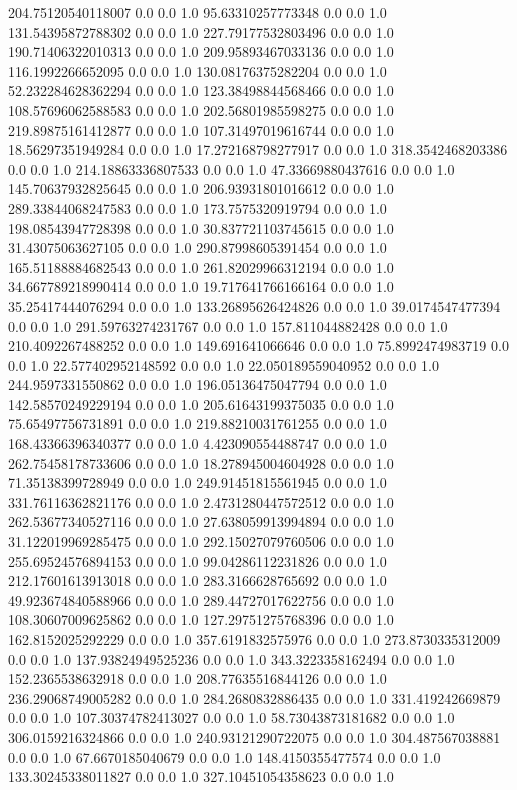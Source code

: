 204.75120540118007	0.0	0.0	1.0
95.63310257773348	0.0	0.0	1.0
131.54395872788302	0.0	0.0	1.0
227.79177532803496	0.0	0.0	1.0
190.71406322010313	0.0	0.0	1.0
209.95893467033136	0.0	0.0	1.0
116.1992266652095	0.0	0.0	1.0
130.08176375282204	0.0	0.0	1.0
52.232284628362294	0.0	0.0	1.0
123.38498844568466	0.0	0.0	1.0
108.57696062588583	0.0	0.0	1.0
202.56801985598275	0.0	0.0	1.0
219.89875161412877	0.0	0.0	1.0
107.31497019616744	0.0	0.0	1.0
18.56297351949284	0.0	0.0	1.0
17.272168798277917	0.0	0.0	1.0
318.3542468203386	0.0	0.0	1.0
214.18863336807533	0.0	0.0	1.0
47.33669880437616	0.0	0.0	1.0
145.70637932825645	0.0	0.0	1.0
206.93931801016612	0.0	0.0	1.0
289.33844068247583	0.0	0.0	1.0
173.7575320919794	0.0	0.0	1.0
198.08543947728398	0.0	0.0	1.0
30.837721103745615	0.0	0.0	1.0
31.43075063627105	0.0	0.0	1.0
290.87998605391454	0.0	0.0	1.0
165.51188884682543	0.0	0.0	1.0
261.82029966312194	0.0	0.0	1.0
34.667789218990414	0.0	0.0	1.0
19.717641766166164	0.0	0.0	1.0
35.25417444076294	0.0	0.0	1.0
133.26895626424826	0.0	0.0	1.0
39.0174547477394	0.0	0.0	1.0
291.59763274231767	0.0	0.0	1.0
157.811044882428	0.0	0.0	1.0
210.4092267488252	0.0	0.0	1.0
149.691641066646	0.0	0.0	1.0
75.8992474983719	0.0	0.0	1.0
22.577402952148592	0.0	0.0	1.0
22.050189559040952	0.0	0.0	1.0
244.9597331550862	0.0	0.0	1.0
196.05136475047794	0.0	0.0	1.0
142.58570249229194	0.0	0.0	1.0
205.61643199375035	0.0	0.0	1.0
75.65497756731891	0.0	0.0	1.0
219.88210031761255	0.0	0.0	1.0
168.43366396340377	0.0	0.0	1.0
4.423090554488747	0.0	0.0	1.0
262.75458178733606	0.0	0.0	1.0
18.278945004604928	0.0	0.0	1.0
71.35138399728949	0.0	0.0	1.0
249.91451815561945	0.0	0.0	1.0
331.76116362821176	0.0	0.0	1.0
2.4731280447572512	0.0	0.0	1.0
262.53677340527116	0.0	0.0	1.0
27.638059913994894	0.0	0.0	1.0
31.122019969285475	0.0	0.0	1.0
292.15027079760506	0.0	0.0	1.0
255.69524576894153	0.0	0.0	1.0
99.04286112231826	0.0	0.0	1.0
212.17601613913018	0.0	0.0	1.0
283.3166628765692	0.0	0.0	1.0
49.923674840588966	0.0	0.0	1.0
289.44727017622756	0.0	0.0	1.0
108.30607009625862	0.0	0.0	1.0
127.29751275768396	0.0	0.0	1.0
162.8152025292229	0.0	0.0	1.0
357.6191832575976	0.0	0.0	1.0
273.8730335312009	0.0	0.0	1.0
137.93824949525236	0.0	0.0	1.0
343.3223358162494	0.0	0.0	1.0
152.2365538632918	0.0	0.0	1.0
208.77635516844126	0.0	0.0	1.0
236.29068749005282	0.0	0.0	1.0
284.2680832886435	0.0	0.0	1.0
331.419242669879	0.0	0.0	1.0
107.30374782413027	0.0	0.0	1.0
58.73043873181682	0.0	0.0	1.0
306.0159216324866	0.0	0.0	1.0
240.93121290722075	0.0	0.0	1.0
304.487567038881	0.0	0.0	1.0
67.6670185040679	0.0	0.0	1.0
148.4150355477574	0.0	0.0	1.0
133.30245338011827	0.0	0.0	1.0
327.10451054358623	0.0	0.0	1.0
